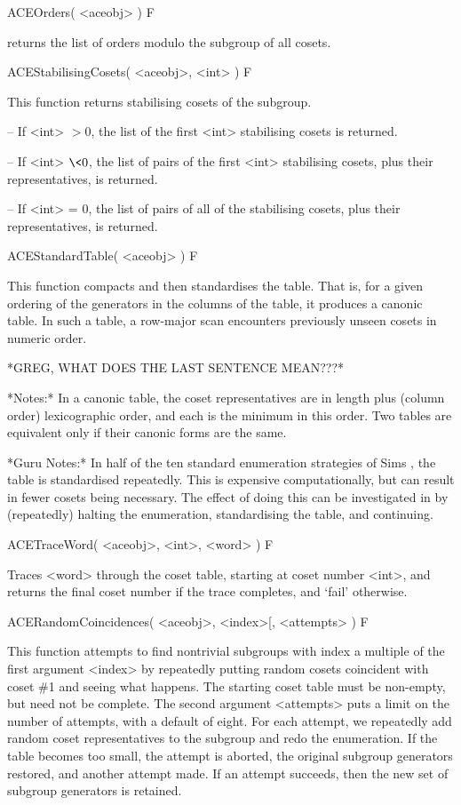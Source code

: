 \>ACEOrders( <aceobj> ) F

returns the list of orders modulo the subgroup of all cosets.


\>ACEStabilisingCosets( <aceobj>, <int> ) F

This function returns stabilising cosets of the subgroup.

\beginlist
\item{--} If <int> $> 0$, the list of the first <int> stabilising cosets
    is returned.
\item{--} If <int> $\< 0$, the list of pairs of the first <int> stabilising
    cosets, plus their representatives, is returned.
\item{--} If <int> = $0$, the list of pairs of all of the stabilising cosets,
    plus their representatives, is returned.
\endlist


\>ACEStandardTable( <aceobj> ) F

This function compacts and then standardises the table.
That is, for a given ordering of the generators in the columns of the
table, it produces a canonic table.
In such a table, a row-major scan encounters previously unseen cosets in
numeric order.

*GREG, WHAT DOES THE LAST SENTENCE MEAN???*

*Notes:*
In a canonic table, the coset representatives are in length plus (column
order) lexicographic order, and each is the minimum in this order.
Two tables are equivalent only if their canonic forms are the same.

*Guru Notes:*
In half of the ten standard enumeration strategies of Sims \cite{Sim94},
the   table   is   standardised   repeatedly.    This   is   expensive
computationally, but can result  in fewer cosets being necessary.  The
effect of  doing this  can be investigated  in {\ACE}  by (repeatedly)
halting the enumeration, standardising the table, and continuing.

\>ACETraceWord( <aceobj>, <int>, <word> ) F

Traces <word> through the coset table, starting at coset number <int>,
and returns the final coset number if the trace completes,
and `fail' otherwise.


\>ACERandomCoincidences( <aceobj>, <index>[, <attempts> ) F

This function attempts  to  find  nontrivial subgroups  with  index  a
multiple  of the first  argument <index> by  repeatedly putting  random
cosets
coincident with coset \#1 and seeing what happens.  The starting coset
table  must  be non-empty,  but  need  not  be complete.   The  second
argument <attempts> puts  a limit on  the number of  attempts,
with a  default of
eight.    For   each  attempt,   we   repeatedly   add  random   coset
representatives  to the  subgroup and  redo the  enumeration.   If the
table becomes too small, the attempt is aborted, the original subgroup
generators  restored,  and  another   attempt  made.   If  an  attempt
succeeds, then the new set of subgroup generators is retained.

